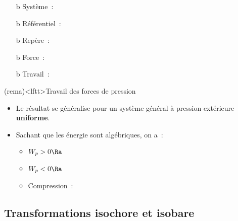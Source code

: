 \documentclass[../../main/main.tex]{subfiles}
\begin{document}
\begin{tcb*}[breakable]
\begin{isd}[righthand ratio=.4]
	\end{isd}
	\tcblower
	\begin{itemize}
		\item[b]{Système}~: 
		\item[b]{Référentiel}~: 
		\item[b]{Repère}~: 
		\item[b]{Force}~: 
		\item[b]{Travail}~:
		\leavevmode\vspace*{-15pt}\relax
		\vspace{-15pt}
	\end{itemize}
\end{tcb*}

\begin{tcb}(rema)<lftt>{Travail des forces de pression}
	\begin{itemize}
		\item Le résultat se généralise pour un système général à pression extérieure
		      \textbf{uniforme}.
		\item Sachant que les énergie sont algébriques, on a~:
		      \begin{itemize}
			      \item $W_p > 0 \Ra$ 
			      \item $W_p < 0 \Ra$ %
			      \item Compression~: 
		      \end{itemize}
	\end{itemize}
\end{tcb}

\subsection{Transformations isochore et isobare}
\end{document}
